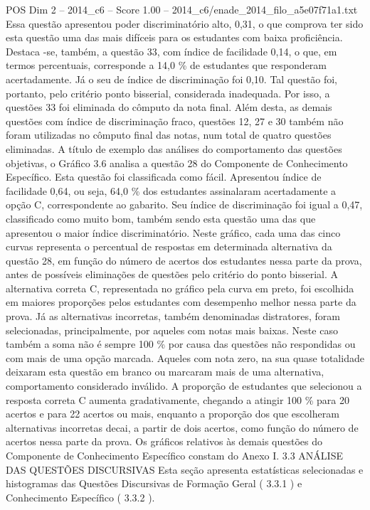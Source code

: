 \begin{textsample}{POS Dim 2 – 2014\_c6 – Score 1.00 – 2014\_c6/enade\_2014\_filo\_a5e07f71a1.txt}
Essa questão apresentou poder discriminatório alto, 0,31, o que comprova ter sido esta questão uma das mais difíceis para os estudantes com baixa proficiência.
Destaca -se, também, a questão 33, com índice de facilidade 0,14, o que, em termos percentuais, corresponde a 14,0 \% de estudantes que responderam acertadamente.
Já o seu de índice de discriminação foi 0,10.
Tal questão foi, portanto, pelo critério ponto bisserial, considerada inadequada.
Por isso, a questões 33 foi eliminada do cômputo da nota final.
Além desta, as demais questões com índice de discriminação fraco, questões 12, 27 e 30 também não foram utilizadas no cômputo final das notas, num total de quatro questões eliminadas.
A título de exemplo das análises do comportamento das questões objetivas, o Gráfico 3.6 analisa a questão 28 do Componente de Conhecimento Específico.
Esta questão foi classificada como fácil.
Apresentou índice de facilidade 0,64, ou seja, 64,0 \% dos estudantes assinalaram acertadamente a opção C, correspondente ao gabarito.
Seu índice de discriminação foi igual a 0,47, classificado como muito bom, também sendo esta questão uma das que apresentou o maior índice discriminatório.
Neste gráfico, cada uma das cinco curvas representa o percentual de respostas em determinada alternativa da questão 28, em função do número de acertos dos estudantes nessa parte da prova, antes de possíveis eliminações de questões pelo critério do ponto bisserial.
A alternativa correta C, representada no gráfico pela curva em preto, foi escolhida em maiores proporções pelos estudantes com desempenho melhor nessa parte da prova.
Já as alternativas incorretas, também denominadas distratores, foram selecionadas, principalmente, por aqueles com notas mais baixas.
Neste caso também a soma não é sempre 100 \% por causa das questões não respondidas ou com mais de uma opção marcada.
Aqueles com nota zero, na sua quase totalidade deixaram esta questão em branco ou marcaram mais de uma alternativa, comportamento considerado inválido.
A proporção de estudantes que selecionou a resposta correta C aumenta gradativamente, chegando a atingir 100 \% para 20 acertos e para 22 acertos ou mais, enquanto a proporção dos que escolheram alternativas incorretas decai, a partir de dois acertos, como função do número de acertos nessa parte da prova.
Os gráficos relativos às demais questões do Componente de Conhecimento Específico constam do Anexo I. 3.3 ANÁLISE DAS QUESTÕES DISCURSIVAS Esta seção apresenta estatísticas selecionadas e histogramas das Questões Discursivas de Formação Geral ( 3.3.1 ) e Conhecimento Específico ( 3.3.2 ).

\end{textsample}
